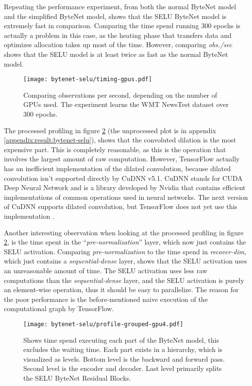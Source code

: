 Repeating the performance experiment, from both the normal ByteNet model and the simplified ByteNet model, shows that the SELU ByteNet model is extremely fast in comparison. Comparing the time spend running 300 epochs is actually a problem in this case, as the heating phase that transfers data and optimizes allocation takes up most of the time. However, comparing \textit{obs./sec} shows that the SELU model is at least twice as fast as the normal ByteNet model.

\begin{figure}[h]
    \centering
    \texttt{[image: bytenet-selu/timing-gpus.pdf]}
    \caption{Comparing observations per second, depending on the number of GPUs used. The experiment learns the WMT NewsTest dataset over 300 epochs.}
    \label{fig:result:selu-bytenet:timing-gpus}
\end{figure}

The processed profiling in figure \ref{fig:result:selu-bytenet:profile-grouped} (the unprocessed plot is in appendix \ref{appendix:result:bytenet-selu}), shows that the convoluted dilation is the most expensive part. This is completely reasonable, as this is the operation that involves the largest amount of raw computation. However, TensorFlow actually has an inefficient implementation of the dilated convolution, because dilated convolution isn't supported directly by CuDNN v5.1. CuDNN stands for CUDA Deep Neural Network and is a library developed by Nvidia that contains efficient implementations of common operations used in neural networks. The next version of CuDNN supports dilated convolution, but TensorFlow does not yet use this implementation \cite{nvidia-cudnn}.

Another interesting observation when looking at the processed profiling in figure \ref{fig:result:selu-bytenet:profile-grouped}, is the time spent in the ``\textit{pre-normalization}'' layer, which now just contains the SELU activation. Comparing \textit{pre-normalization} to the time spend in \textit{recover-dim}, which just contains a \textit{sequential-dense} layer, shows that the SELU activation uses an unreasonable amount of time. The SELU activation uses less raw computations than the \textit{sequential-dense} layer, and the SELU activation is purely an element-wise operation, thus it should be easy to parallelize. The reason for the poor performance is the before-mentioned naive execution of the computational graph by TensorFlow.

\begin{figure}[h]
    \centering
    \texttt{[image: bytenet-selu/profile-grouped-gpu4.pdf]}
    \caption{Shows time spend executing each part of the ByteNet model, this excludes the waiting time. Each part exists in a hierarchy, which is visualized as levels. Bottom level is the backward and forward pass. Second level is the encoder and decoder. Last level primarily splits the SELU ByteNet Residual Blocks.}
    \label{fig:result:selu-bytenet:profile-grouped}
\end{figure}

